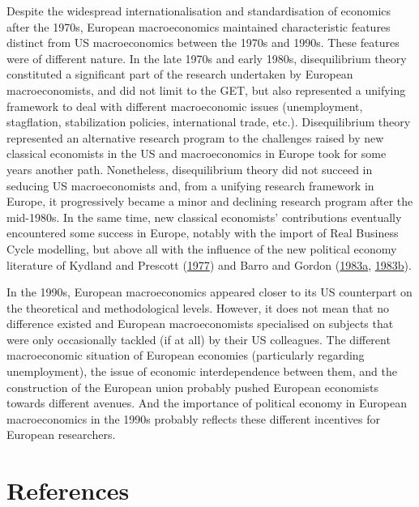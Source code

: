\documentclass[
  12pt,
  onecolumn]{article}
\begin{document}
Despite the widespread internationalisation and standardisation of
economics after the 1970s, European macroeconomics maintained
characteristic features distinct from US macroeconomics between the
1970s and 1990s. These features were of different nature. In the late
1970s and early 1980s, disequilibrium theory constituted a significant
part of the research undertaken by European macroeconomists, and did not
limit to the GET, but also represented a unifying framework to deal with
different macroeconomic issues (unemployment, stagflation, stabilization
policies, international trade, etc.). Disequilibrium theory represented
an alternative research program to the challenges raised by new
classical economists in the US and macroeconomics in Europe took for
some years another path. Nonetheless, disequilibrium theory did not
succeed in seducing US macroeconomists and, from a unifying research
framework in Europe, it progressively became a minor and declining
research program after the mid-1980s. In the same time, new classical
economists' contributions eventually encountered some success in Europe,
notably with the import of Real Business Cycle modelling, but above all
with the influence of the new political economy literature of Kydland
and Prescott (\protect\hyperlink{ref-kydland1977}{1977}) and Barro and
Gordon (\protect\hyperlink{ref-barro1983}{1983a},
\protect\hyperlink{ref-barro1983c}{1983b}).

In the 1990s, European macroeconomics appeared closer to its US
counterpart on the theoretical and methodological levels. However, it
does not mean that no difference existed and European macroeconomists
specialised on subjects that were only occasionally tackled (if at all)
by their US colleagues. The different macroeconomic situation of
European economies (particularly regarding unemployment), the issue of
economic interdependence between them, and the construction of the
European union probably pushed European economists towards different
avenues. And the importance of political economy in European
macroeconomics in the 1990s probably reflects these different incentives
for European researchers.

\newpage

\hypertarget{references}{%
\section*{References}\label{references}}
\end{document}
